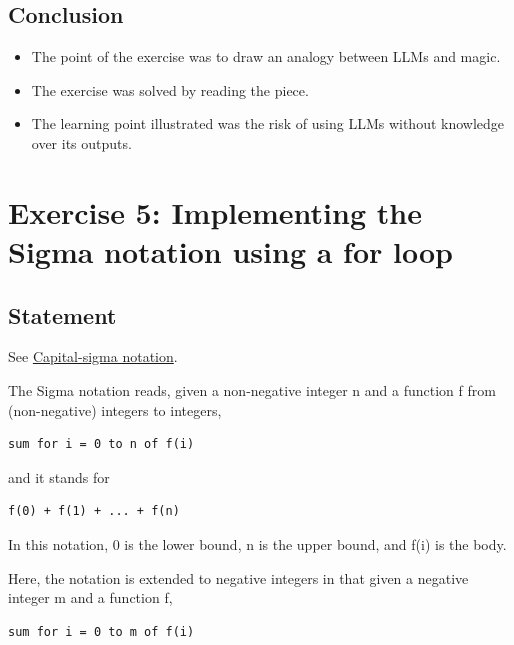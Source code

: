 \documentclass[12pt]{article}
\begin{document}

\subsection{Conclusion}

\begin{itemize}

\item
  The point of the exercise was to draw an analogy between LLMs and magic.

\item
  The exercise was solved by reading the piece.

\item
  The learning point illustrated was the risk of using LLMs without knowledge over its outputs.

\end{itemize}


\newpage

\section{Exercise 5: Implementing the Sigma notation using a for loop}


\subsection{Statement}

See \href{https://en.wikipedia.org/wiki/Capital-sigma_notation}{Capital-sigma notation}.

The Sigma notation reads, given a non-negative integer n and a function f from
(non-negative) integers to integers,

\begin{verbatim}
sum for i = 0 to n of f(i)
\end{verbatim}

and it stands for

\begin{verbatim}
f(0) + f(1) + ... + f(n)
\end{verbatim}

In this notation, 0 is the lower bound, n is the upper bound, and f(i) is the
body.

Here, the notation is extended to negative integers in that given a negative
integer m and a function f,

\begin{verbatim}
sum for i = 0 to m of f(i)
\end{verbatim}
\end{document}
